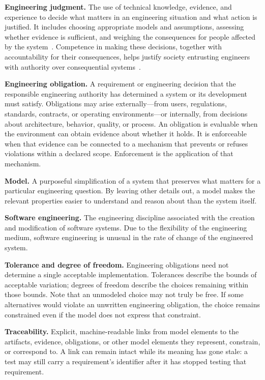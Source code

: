 \textbf{Engineering judgment.} The use of technical knowledge, evidence, and experience to decide what matters in an engineering situation and what action is justified. It includes choosing appropriate models and assumptions, assessing whether evidence is sufficient, and weighing the consequences for people affected by the system~\citep{petroski1994judgment, swenson2025judgment}. Competence in making these decisions, together with accountability for their consequences, helps justify society entrusting engineers with authority over consequential systems~\citep{engineeringcouncil2026ethics}.

\textbf{Engineering obligation.} A requirement or engineering decision that the responsible engineering authority has determined a system or its development must satisfy. Obligations may arise externally---from users, regulations, standards, contracts, or operating environments---or internally, from decisions about architecture, behavior, quality, or process. An obligation is evaluable when the environment can obtain evidence about whether it holds. It is enforceable when that evidence can be connected to a mechanism that prevents or refuses violations within a declared scope. Enforcement is the application of that mechanism.

\textbf{Model.} A purposeful simplification of a system that preserves what matters for a particular engineering question. By leaving other details out, a model makes the relevant properties easier to understand and reason about than the system itself.

\textbf{Software engineering.} The engineering discipline associated with the creation and modification of software systems. Due to the flexibility of the engineering medium, software engineering is unusual in the rate of change of the engineered system. 



\textbf{Tolerance and degree of freedom.} Engineering obligations need not determine a single acceptable implementation. Tolerances describe the bounds of acceptable variation; degrees of freedom describe the choices remaining within those bounds. Note that an unmodeled choice may not truly be free. If some alternatives would violate an unwritten engineering obligation, the choice remains constrained even if the model does not express that constraint.

\textbf{Traceability.} Explicit, machine-readable links from model elements to the artifacts, evidence, obligations, or other model elements they represent, constrain, or correspond to. A link can remain intact while its meaning has gone stale: a test may still carry a requirement's identifier after it has stopped testing that requirement.


